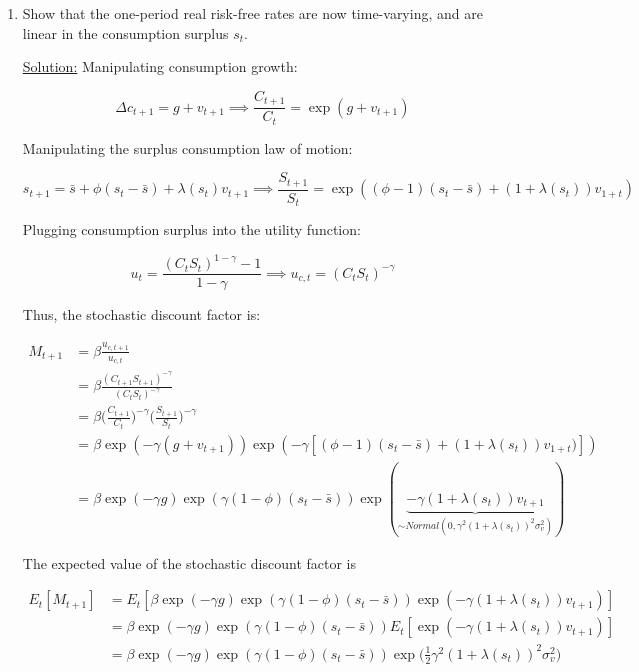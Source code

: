 \documentclass{article}
\begin{document}
\begin{enumerate}

\item Show that the one-period real risk-free rates are now time-varying, and are linear in the consumption surplus $s_t$.

\underline{Solution:} Manipulating consumption growth:

$$
\Delta c_{t+1} = g + v_{t +1} 
\implies 
\frac{C_{t+1}}{C_t} = \exp(g + v_{t+1})
$$

Manipulating the surplus consumption law of motion:

$$
s_{t+1} = \bar{s} + \phi(s_t - \bar{s}) + \lambda(s_t) v_{t+1} 
\implies 
\frac{S_{t+1}}{S_t} = \exp((\phi-1)(s_t - \bar{s}) + (1 + \lambda(s_t))v_{1+t})
$$

Plugging consumption surplus into the utility function:

$$
u_t = \frac{(C_t S_t)^{1-\gamma} - 1}{1-\gamma} \implies u_{c, t} = (C_t S_t)^{-\gamma}
$$

\pagebreak

Thus, the stochastic discount factor is:

\begin{align*}
M_{t+1} 
&= \beta \frac{u_{c, t+1}}{u_{c, t}} \\
&= \beta \frac{(C_{t+1} S_{t+1})^{-\gamma}}{(C_t S_t)^{-\gamma}} \\
&= \beta \Bigg(\frac{C_{t+1}}{C_t}\Bigg)^{-\gamma} \Bigg(\frac{S_{t+1}}{S_t}\Bigg)^{-\gamma} \\
&= \beta \exp(-\gamma(g + v_{t+1})) \exp(-\gamma[(\phi-1)(s_t - \bar{s}) + (1 + \lambda(s_t))v_{1+t})]) \\
&= \beta \exp(-\gamma g)\exp(\gamma(1-\phi)(s_t - \bar{s}))\exp(\underbrace{-\gamma(1+\lambda(s_t))v_{t+1}}_{\sim Normal(0, \gamma^2(1+\lambda(s_t))^2\sigma_v^2)})
\end{align*}

The expected value of the stochastic discount factor is

\begin{align*}
E_t[M_{t+1}]
&= E_t[\beta \exp(-\gamma g)\exp(\gamma(1-\phi)(s_t - \bar{s}))\exp(-\gamma(1+\lambda(s_t))v_{t+1})]\\
&= \beta \exp(-\gamma g)\exp(\gamma(1-\phi)(s_t - \bar{s}))E_t[\exp(-\gamma(1+\lambda(s_t))v_{t+1})]\\
&= \beta \exp(-\gamma g)\exp(\gamma(1-\phi)(s_t - \bar{s}))\exp\Bigg(\frac{1}{2}\gamma^2 (1+\lambda(s_t))^2\sigma_v^2\Bigg)
\end{align*}


\end{enumerate}
\end{document}
